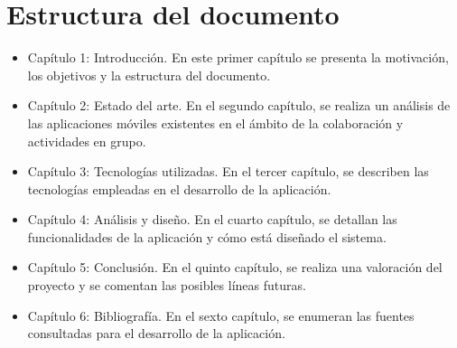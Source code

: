 \section{Estructura del documento}
\begin{itemize}
\item Capítulo 1: Introducción. En este primer capítulo se presenta la 
motivación, los objetivos y la estructura del documento.
\item Capítulo 2: Estado del arte. En el segundo capítulo, se 
realiza un análisis de las aplicaciones móviles existentes en el 
ámbito de la colaboración y actividades en grupo.
\item Capítulo 3: Tecnologías utilizadas. En el tercer capítulo, 
se describen las tecnologías empleadas en el desarrollo de la aplicación.
\item Capítulo 4: Análisis y diseño. En el cuarto capítulo, 
se detallan las funcionalidades de la aplicación y cómo 
está diseñado el sistema.
\item Capítulo 5: Conclusión. En el quinto capítulo, se realiza 
una valoración del proyecto y se comentan las posibles líneas futuras.
\item Capítulo 6: Bibliografía. En el sexto capítulo, se enumeran 
las fuentes consultadas para el desarrollo de la aplicación. 

\end{itemize}